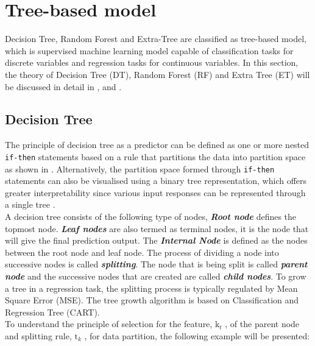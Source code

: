 \section{Tree-based model}\label{sec:tree_intro}

Decision Tree, Random Forest and Extra-Tree are classified as tree-based model, which is supervised machine learning model capable of classification tasks for discrete variables and regression tasks for continuous variables. In this section, the theory of Decision Tree (DT), Random Forest (RF) and Extra Tree (ET) will be discussed in detail in ,  and .\\  

\subsection{Decision Tree}\label{sec:dt_theo}

The principle of decision tree as a predictor can be defined as one or more nested {\tt if-then} statements based on a rule that partitions the data into partition space as shown in . Alternatively, the partition space formed through {\tt if-then} statements can also be visualised using a binary tree representation, which offers greater interpretability since various input responses can be represented through a single tree .\\

A decision tree consists of the following type of nodes, \textbf{\emph{Root node}} defines the topmost node. \textbf{\emph{Leaf nodes}} are also termed as terminal nodes, it is the node that will give the final prediction output. The \textbf{\emph{Internal Node}} is defined as the nodes between the root node and leaf node. The process of dividing a node into successive nodes is called \textbf{\emph{splitting}}. The node that is being split is called \textbf{\emph{parent node}} and the successive nodes that are created are called \textbf{\emph{child nodes}}. To grow a tree in a regression task, the splitting process is typically regulated by Mean Square Error (MSE). The tree growth algorithm is based on Classification and Regression Tree (CART).\\

To understand the principle of selection for the feature, $\text{k}_t$ , of the parent node and splitting rule, $\text{t}_k$ , for data partition, the following example will be presented:\\

